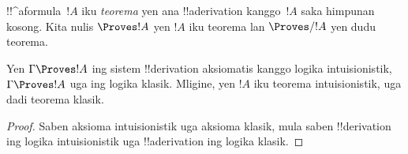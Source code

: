 \documentclass[../../../include/open-logic-section]{subfiles}
\begin{document}
\begin{defn}[Teorema]
!!^a{formula}~$!A$ iku \emph{teorema} yen ana !!a{derivation}
kanggo~$!A$ saka himpunan kosong. Kita nulis $\Proves !A$ yen $!A$
iku teorema lan $\Proves/ !A$ yen dudu teorema.
\end{defn}

\begin{prop}
  Yen $\Gamma \Proves !A$ ing sistem !!{derivation} aksiomatis kanggo
  logika intuisionistik, $\Gamma \Proves !A$ uga ing logika klasik.
  Mligine, yen $!A$ iku teorema intuisionistik, uga dadi teorema klasik.
\end{prop}

\begin{proof}
  Saben aksioma intuisionistik uga aksioma klasik, mula saben
  !!{derivation} ing logika intuisionistik uga !!a{derivation} ing
  logika klasik.
\end{proof}
\end{document}

